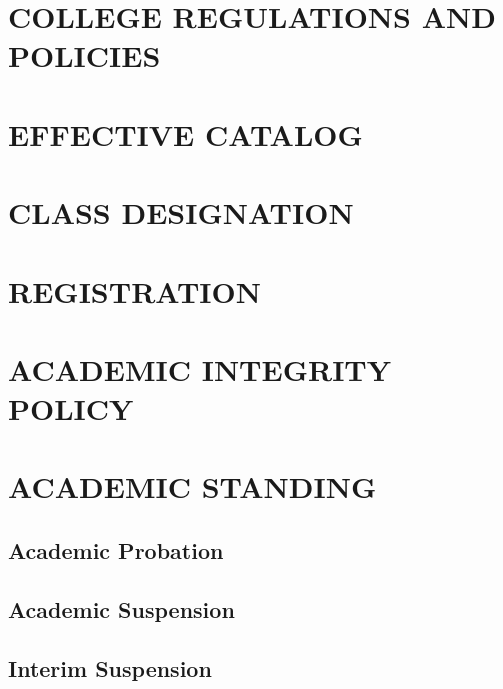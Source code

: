 \documentclass[
  letterpaper,
]{scrbook}
\begin{document}
\hypertarget{college-regulations-and-policies}{%
\chapter{COLLEGE REGULATIONS AND
POLICIES}\label{college-regulations-and-policies}}

\hypertarget{effective-catalog}{%
\chapter{EFFECTIVE CATALOG}\label{effective-catalog}}

\hypertarget{class-designation}{%
\chapter{CLASS DESIGNATION}\label{class-designation}}

\hypertarget{registration}{%
\chapter{REGISTRATION}\label{registration}}

\hypertarget{academic-integrity-policy}{%
\chapter{ACADEMIC INTEGRITY POLICY}\label{academic-integrity-policy}}

\hypertarget{academic-standing}{%
\chapter{ACADEMIC STANDING}\label{academic-standing}}

\hypertarget{academic-probation}{%
\section{Academic Probation}\label{academic-probation}}

\hypertarget{academic-suspension}{%
\section{Academic Suspension}\label{academic-suspension}}

\hypertarget{interim-suspension}{%
\section{Interim Suspension}\label{interim-suspension}}
\end{document}

